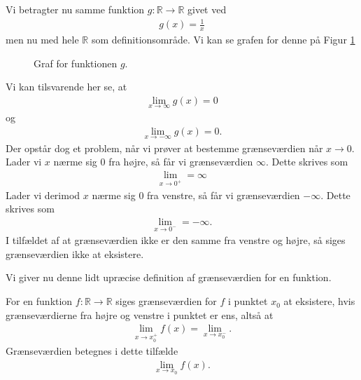 \begin{exa}
	Vi betragter nu samme funktion $g: \mathbb{R} \to \mathbb{R}$ givet ved
	\begin{align*}
		g(x) = \frac{1}{x}
	\end{align*}	 
	men nu med hele $\mathbb{R}$ som	definitionsområde. Vi kan se grafen for denne på Figur \ref{fig:grænse2}
	\begin{figure}[H]
	\centering
	\caption{Graf for funktionen $g$.}
	\label{fig:grænse2}
	\end{figure}
	Vi kan tilsvarende her se, at 
	\begin{align*}
		\lim_{x \to \infty} g(x) = 0
	\end{align*}
	og 
	\begin{align*}
		\lim_{x \to -\infty} g(x) = 0.
	\end{align*}
	Der opstår dog et problem, når vi prøver at bestemme grænseværdien når $x \to 0$. Lader vi $x$ nærme sig 0
	fra højre, så får vi grænseværdien $\infty$. 
	Dette skrives som 
	\begin{align*}
		\lim_{x \to 0^+} = \infty 	
	\end{align*}		
	 Lader vi derimod $x$ nærme sig 0 fra venstre, så får
	vi grænseværdien $-\infty$. Dette skrives som
	\begin{align*}
		\lim_{x \to 0^{-}} = -\infty.
	\end{align*}
	I tilfældet af at grænseværdien ikke er den samme fra venstre og højre, så siges grænseværdien ikke at 
	eksistere.
\end{exa}
Vi giver nu denne lidt upræcise definition af grænseværdien for en funktion.
\begin{defn}[Grænseværdi]
	For en funktion $f:\mathbb{R} \to \mathbb{R}$ siges grænseværdien for $f$ i punktet $x_0$ at eksistere, 
	hvis grænseværdierne fra højre og venstre i punktet er ens, altså at
	\begin{align*}
		\lim_{x \to x_0^+}f(x) = \lim_{x \to x_0^-}.
	\end{align*}
	Grænseværdien betegnes i dette tilfælde
	\begin{align*}
		\lim_{x \to x_0}f(x).
	\end{align*}
\end{defn}

